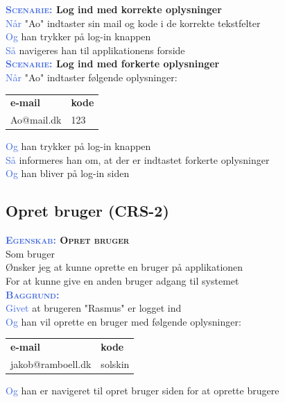 \textbf{\textsc{\textcolor{RoyalBlue}{Scenarie:}} Log ind med korrekte oplysninger}\\
\textcolor{RoyalBlue}{Når} "Ao" indtaster sin mail og kode i de korrekte tekstfelter\\
\textcolor{RoyalBlue}{Og} han trykker på log-in knappen\\
\textcolor{RoyalBlue}{Så} navigeres han til applikationens forside\\

\textbf{\textsc{\textcolor{RoyalBlue}{Scenarie:}} Log ind med forkerte oplysninger} \\
\textcolor{RoyalBlue}{Når} "Ao" indtaster følgende oplysninger:\\
\begin{tabular}{| l | l |}
	\textbf{e-mail} & \textbf{kode}\\
	Ao@mail.dk & 123\\
\end{tabular}
\newline \newline

\textcolor{RoyalBlue}{Og} han trykker på log-in knappen\\
\textcolor{RoyalBlue}{Så} informeres han om, at der er indtastet forkerte oplysninger\\
\textcolor{RoyalBlue}{Og} han bliver på log-in siden\\

\clearpage

\subsection{Opret bruger (CRS-2)} \label{sec:USOpretBruger}
\textbf{\textsc{\textcolor{RoyalBlue}{Egenskab:} Opret bruger}} \\
Som bruger\\
Ønsker jeg at kunne oprette en bruger på applikationen\\
For at kunne give en anden bruger adgang til systemet \\

\textcolor{RoyalBlue}{\textbf{\textsc{Baggrund:}}}\\
\textcolor{RoyalBlue}{Givet} at brugeren "Rasmus" er logget ind \\
\textcolor{RoyalBlue}{Og} han vil oprette en bruger med følgende oplysninger:\\
\begin{tabular}{| l | l |}
	\textbf{e-mail} & \textbf{kode} \\
	jakob@ramboell.dk & solskin\\
\end{tabular}
\newline \newline
\textcolor{RoyalBlue}{Og} han er navigeret til opret bruger siden for at oprette brugere  \\


